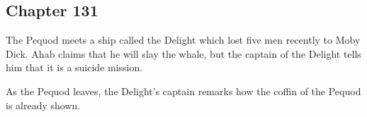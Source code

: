 \subsection{Chapter 131}

The Pequod meets a ship called the Delight which lost five men recently to Moby
Dick. Ahab claims that he will slay the whale, but the captain of the Delight
tells him that it is a suicide mission.

As the Pequod leaves, the Delight's captain remarks how the coffin of the
Pequod is already shown.
